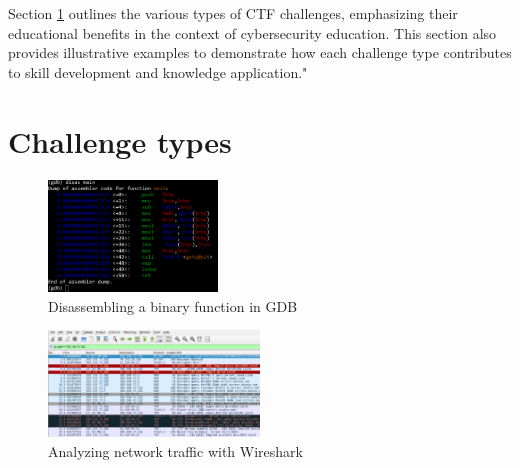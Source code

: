 \documentclass[conference]{IEEEtran}
\begin{document}
Section \ref{sec-challenge-types} outlines the various types of CTF challenges,
emphasizing their educational benefits in the context of cybersecurity
education. This section also provides illustrative examples to demonstrate how
each challenge type contributes to skill development and knowledge
application."

\cite{gyorok2014}
\cite{safar2019}
\cite{beszedes2023}

\cite{rahman2020}

\cite{schneider2013}

\cite{lhee2003}
\cite{ndatinya2015}

\cite{stallman1988}

\cite{eagle2020}

\cite{butun2019}

\cite{ziade2004}

\section{Challenge types}
\label{sec-challenge-types}

\begin{figure}[htbp]
	\centering
	\includegraphics[width=0.4\textwidth]{fig/gdb.png}
	\caption{Disassembling a binary function in GDB}
	\label{fig-gdb}
\end{figure}

\begin{figure}[htbp]
	\centering
	\includegraphics[width=0.5\textwidth]{fig/wireshark.png}
	\caption{Analyzing network traffic with Wireshark}
	\label{fig-wireshark}
\end{figure}
\end{document}
